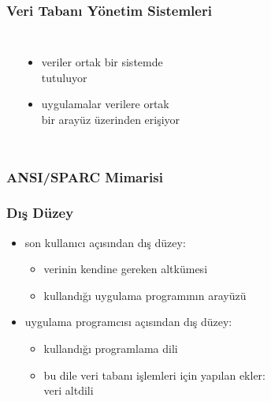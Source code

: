 \documentclass[dvipsnames]{beamer}
\theoremstyle{definition}
\theoremstyle{example}
\theoremstyle{plain}
\begin{document}
\begin{frame}
  \frametitle{Veri Tabanı Yönetim Sistemleri}

  \begin{columns}[b]
    \begin{center}
    \end{center}

    \begin{itemize}
      \item veriler ortak bir sistemde\\
        tutuluyor
      \item uygulamalar verilere ortak\\
        bir arayüz üzerinden erişiyor
    \end{itemize}
  \end{columns}
\end{frame}

\begin{frame}
  \frametitle{ANSI/SPARC Mimarisi}

  \begin{center}
  \end{center}
\end{frame}

\begin{frame}
  \frametitle{Dış Düzey}

  \begin{itemize}
    \item son kullanıcı açısından dış düzey:
    \begin{itemize}
      \item verinin kendine gereken altkümesi
      \item kullandığı uygulama programının arayüzü
    \end{itemize}

    \pause
    \bigskip
    \item uygulama programcısı açısından dış düzey:
    \begin{itemize}
      \item kullandığı programlama dili
      \item bu dile veri tabanı işlemleri için yapılan ekler:\\
        \alert{veri altdili}
    \end{itemize}
  \end{itemize}
\end{frame}
\end{document}
